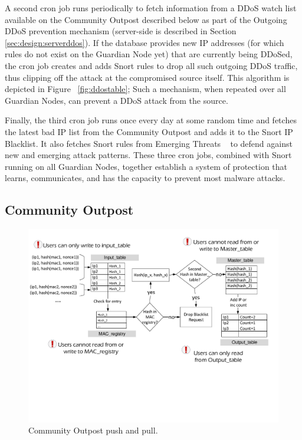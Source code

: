 A second cron job runs periodically to fetch information from a DDoS watch list available on the Community Outpost described below as part of the Outgoing DDoS prevention mechanism (server-side is described in Section \ref{sec:design:serverddos}). If the database provides new IP addresses (for which rules do not exist on the Guardian Node yet) that are currently being DDoSed, the cron job creates and adds Snort rules to drop all such outgoing DDoS traffic, thus clipping off the attack at the compromised source itself. 
This algorithm is depicted in Figure ~\ref{fig:ddostable}; Such a mechanism, when repeated over all Guardian Nodes, can prevent a DDoS attack from the source.

Finally, the third cron job runs once every day at some random time and fetches the latest bad IP list from the Community Outpost and adds it to the Snort IP Blacklist. It also fetches Snort rules from Emerging Threats ~\cite{emerging} to defend against new and emerging attack patterns. These three cron jobs, combined with Snort running on all Guardian Nodes, together establish a system of protection that learns, communicates, and has the capacity to prevent most malware attacks.

\subsection{Community Outpost}
\label{sec:design:server}

\begin{figure}
    \centering
    \includegraphics[width=0.95\linewidth]{figs/blacklist.pdf}
    \caption{Community Outpost push and pull.}
    \label{fig:blacklistserver}
\end{figure}

